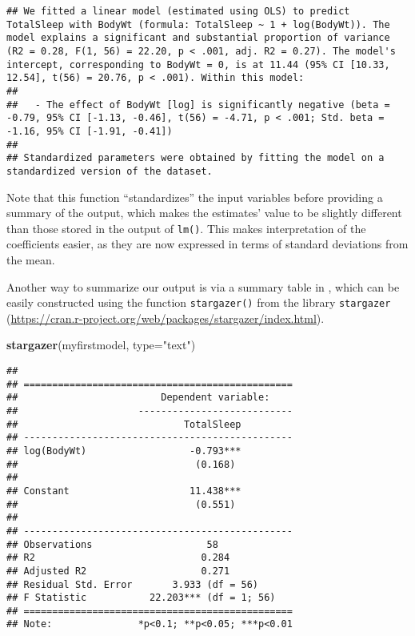 \documentclass[
]{book}
\newenvironment{Shaded}{\begin{snugshade}}{\end{snugshade}}
\newcommand{\DataTypeTok}[1]{\textcolor[rgb]{0.13,0.29,0.53}{#1}}
\newcommand{\KeywordTok}[1]{\textcolor[rgb]{0.13,0.29,0.53}{\textbf{#1}}}
\newcommand{\NormalTok}[1]{#1}
\newcommand{\StringTok}[1]{\textcolor[rgb]{0.31,0.60,0.02}{#1}}
\begin{document}
\begin{verbatim}
## We fitted a linear model (estimated using OLS) to predict TotalSleep with BodyWt (formula: TotalSleep ~ 1 + log(BodyWt)). The model explains a significant and substantial proportion of variance (R2 = 0.28, F(1, 56) = 22.20, p < .001, adj. R2 = 0.27). The model's intercept, corresponding to BodyWt = 0, is at 11.44 (95% CI [10.33, 12.54], t(56) = 20.76, p < .001). Within this model:
## 
##   - The effect of BodyWt [log] is significantly negative (beta = -0.79, 95% CI [-1.13, -0.46], t(56) = -4.71, p < .001; Std. beta = -1.16, 95% CI [-1.91, -0.41])
## 
## Standardized parameters were obtained by fitting the model on a standardized version of the dataset.
\end{verbatim}

Note that this function ``standardizes'' the input variables before providing a summary of the output, which makes the estimates' value to be slightly different than those stored in the output of \texttt{lm()}. This makes interpretation of the coefficients easier, as they are now expressed in terms of standard deviations from the mean.

Another way to summarize our output is via a summary table in , which can be easily constructed using the function \texttt{stargazer()} from the library \texttt{stargazer} (\url{https://cran.r-project.org/web/packages/stargazer/index.html}).

\begin{Shaded}
\begin{Highlighting}[]
\KeywordTok{stargazer}\NormalTok{(myfirstmodel, }\DataTypeTok{type=}\StringTok{"text"}\NormalTok{)}
\end{Highlighting}
\end{Shaded}

\begin{verbatim}
## 
## ===============================================
##                         Dependent variable:    
##                     ---------------------------
##                             TotalSleep         
## -----------------------------------------------
## log(BodyWt)                  -0.793***         
##                               (0.168)          
##                                                
## Constant                     11.438***         
##                               (0.551)          
##                                                
## -----------------------------------------------
## Observations                    58             
## R2                             0.284           
## Adjusted R2                    0.271           
## Residual Std. Error       3.933 (df = 56)      
## F Statistic           22.203*** (df = 1; 56)   
## ===============================================
## Note:               *p<0.1; **p<0.05; ***p<0.01
\end{verbatim}
\end{document}
